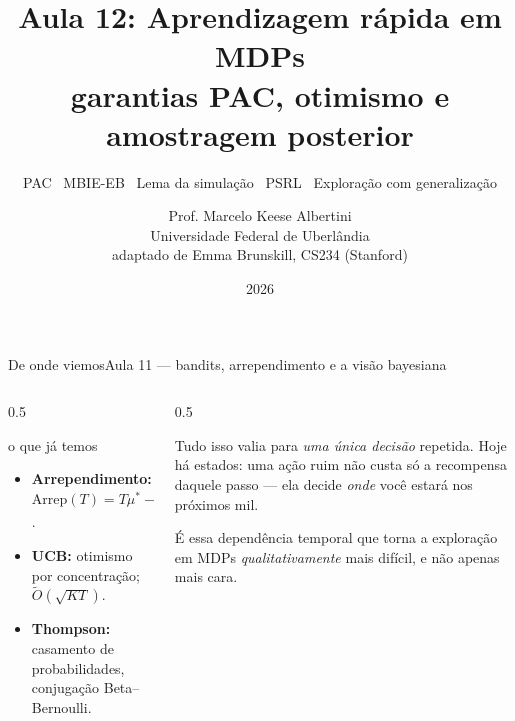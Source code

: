 \documentclass[aspectratio=169, 11pt]{beamer}
\title[Aula 12 — RL rápida em MDPs]{Aula 12: Aprendizagem rápida em MDPs\\ garantias PAC, otimismo e amostragem posterior}
\subtitle[Aprendizagem por Reforço]{PAC \textbullet\ MBIE-EB \textbullet\ Lema da simulação \textbullet\ PSRL \textbullet\ Exploração com generalização}
\author[Prof. Marcelo K. Albertini]{Prof. Marcelo Keese Albertini \\
  \footnotesize Universidade Federal de Uberlândia \\
  \footnotesize adaptado de Emma Brunskill, CS234 (Stanford)}
\institute{Universidade Federal de Uberlândia}
\date{2026}
\begin{document}
\begin{frame}\titlepage\end{frame}

\begin{frame}{De onde viemos}{Aula 11 --- bandits, arrependimento e a visão bayesiana}
  \begin{columns}[T]
    \begin{column}{0.5\textwidth}
      \begin{defbox}{o que já temos}
        \begin{itemize}
          \item \textbf{Arrependimento:} $\mathrm{Arrep}(T) = T\mu^{*} - \sum_{t}\mu_{a_t}$.
          \item \textbf{UCB:} otimismo por concentração; $\tilde{O}(\sqrt{KT})$.
          \item \textbf{Thompson:} casamento de probabilidades, conjugação Beta--Bernoulli.
        \end{itemize}
      \end{defbox}
    \end{column}
    \begin{column}{0.5\textwidth}
      \begin{ideiabox}
        Tudo isso valia para \emph{uma única decisão} repetida. Hoje há \alert{estados}:
        uma ação ruim não custa só a recompensa daquele passo --- ela decide
        \emph{onde} você estará nos próximos mil.
      \end{ideiabox}
      \begin{alertabox}
        É essa dependência temporal que torna a exploração em MDPs
        \emph{qualitativamente} mais difícil, e não apenas mais cara.
      \end{alertabox}
    \end{column}
  \end{columns}
\end{frame}
\end{document}
